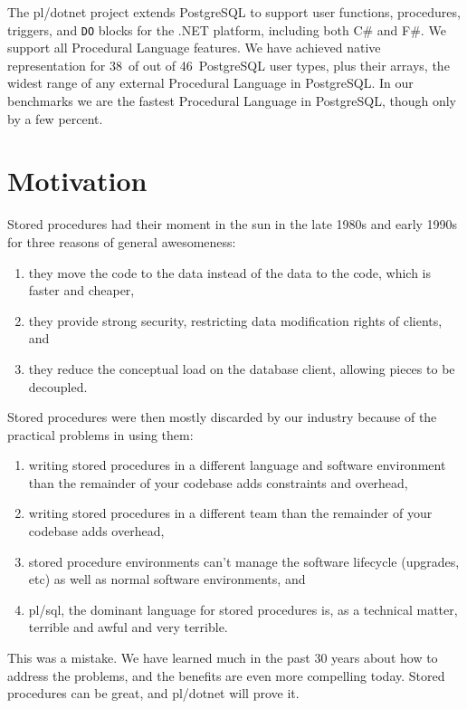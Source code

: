 \documentclass[sigconf,techreport,authorversion,nonacm]{acmart}
\newcommand{\dotnet}{.NET }
\newcommand{\psqltypecount}{46}
\newcommand{\pldotnettypecount}{38}
\begin{document}
The pl/dotnet project extends PostgreSQL to support user functions,
procedures, triggers, and \texttt{DO} blocks for the \dotnet platform,
including both C\# and F\#.  We support all Procedural Language features.
We have achieved native representation for \pldotnettypecount\ of out
of \psqltypecount\ PostgreSQL user types, plus their arrays, the widest
range of any external Procedural Language in PostgreSQL. In our benchmarks
we are the fastest Procedural Language in PostgreSQL, though only by
a few percent.

\section{Motivation}

Stored procedures had their moment in the sun in the late 1980s
and early 1990s for three reasons of general awesomeness:

\begin{enumerate}[itemsep=0pt]
    \item they move the code to the data instead of the data to the code, which is faster and cheaper,
    \item they provide strong security, restricting data modification rights of clients, and
    \item they reduce the conceptual load on the database client, allowing pieces to be decoupled.
\end{enumerate}

Stored procedures were then mostly discarded by our industry because
of the practical problems in using them:

\begin{enumerate}[itemsep=0pt]
    \item writing stored procedures in a different language and software environment than the remainder of your codebase adds constraints and overhead,
    \item writing stored procedures in a different team than the remainder of your codebase adds overhead,
    \item stored procedure environments can't manage the software lifecycle (upgrades, etc) as well as normal software environments, and
    \item pl/sql, the dominant language for stored procedures is, as a technical matter, terrible and awful and very terrible.
\end{enumerate}

This was a mistake.  We have learned much in the past 30 years about how
to address the problems, and the benefits are even more compelling today.
Stored procedures can be great, and pl/dotnet will prove it.
\end{document}
